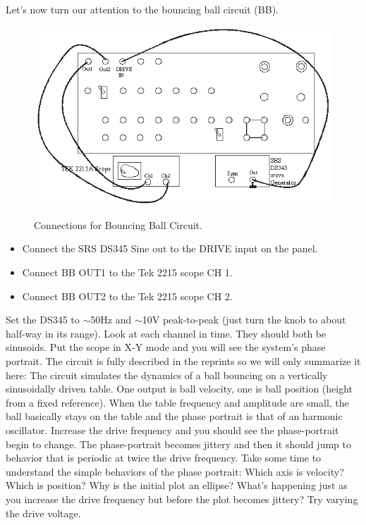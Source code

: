 \documentclass{../lab}
\begin{document}
Let's now turn our attention to the bouncing ball circuit (BB).

\begin{figure}[h]
    \centering
    \href{http://experimentationlab.berkeley.edu/sites/default/files/images/Nldimage130.png}{\includegraphics[width=0.7\linewidth]{images/Nldimage130.png}}
    \caption{Connections for Bouncing Ball Circuit.}
    \label{fig:ConnectionsForBouncingBallCircuit}
\end{figure}

\begin{itemize}
    \item Connect the SRS DS345 Sine out to the DRIVE input on the panel.

    \item Connect BB OUT1 to the Tek 2215 scope CH 1.

    \item Connect BB OUT2 to the Tek 2215 scope CH 2.
\end{itemize}

\newpage

Set the DS345 to  $\sim$50Hz and  $\sim$10V peak-to-peak (just turn the knob to about half-way in its range). Look at each channel in time. They should both be sinusoids. Put the scope in X-Y mode and you will see the system's phase portrait. The circuit is fully described in the reprints so we will only summarize it here: The circuit simulates the dynamics of a ball bouncing on a vertically sinusoidally driven table. One output is ball velocity, one is ball position (height from a fixed reference). When the table frequency and amplitude are small, the ball basically stays on the table and the phase portrait is that of an harmonic oscillator. Increase the drive frequency and you should see the phase-portrait begin to change. The phase-portrait becomes jittery and then it should jump to behavior that is periodic at twice the drive frequency. Take some time to understand the simple behaviors of the phase portrait: Which axis is velocity? Which is position? Why is the initial plot an ellipse? What's happening just as you increase the drive frequency but before the plot becomes jittery? Try varying the drive voltage.
\end{document}
